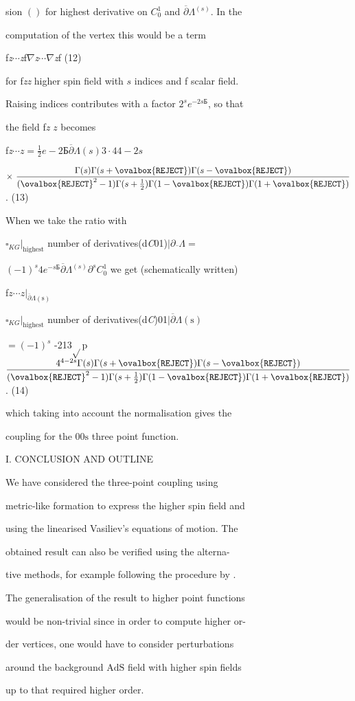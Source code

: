 \documentclass[a4paper,12pt]{article}
\begin{document}
sion $()$ for highest derivative on $C_{0}^{1}$ and $\overline{\partial}\Lambda^{(s)}$. In the

computation of the vertex this would be a term

f{\it z}$\cdots${\it z}f$\nabla${\it z}$\cdots\nabla${\it z}f (12)

for f{\it zz} higher spin field with $s$ indices and f scalar field.

Raising indices contributes with a factor $2^{s}e^{-2sБ}$, so that

the field f{\it z} $z$ becomes

f{\it z}$\cdots z=\displaystyle \frac{1}{2}e-2Б\overline{\partial}\Lambda(s)3\cdot 44-2s$
\begin{center}
$\displaystyle \times\ \frac{\Gamma(s)\Gamma(s+\ovalbox{\tt\small REJECT})\Gamma(s-\ovalbox{\tt\small REJECT})}{(\ovalbox{\tt\small REJECT}^{2}-1)\Gamma(s+\frac{1}{2})\Gamma(1-\ovalbox{\tt\small REJECT})\Gamma(1+\ovalbox{\tt\small REJECT})}$.   (13)
\end{center}
When we take the ratio with

$\square _{KG}|_{\mathrm{h}\mathrm{i}\mathrm{g}\mathrm{h}\mathrm{e}\mathrm{s}\mathrm{t}}$ number of derivatives(d{\it C}01)$|\partial\overline{}\Lambda =$

$(-1)^{s}4e^{-sБ}\overline{\partial}\Lambda^{(s)}\partial^{s}C_{0}^{1}$ we get (schematically written)
\begin{center}
f$ z\cdots z|_{\overline{\partial}\Lambda(\mathrm{s})}$
\end{center}
$\square _{KG}|_{\mathrm{h}\mathrm{i}\mathrm{g}\mathrm{h}\mathrm{e}\mathrm{s}\mathrm{t}}$ number of derivatives(d{\it C})01$| \overline{\partial}\Lambda(\mathrm{s})$

$= (-1)^{s}$ -213$\sqrt{}$p $\displaystyle \frac{4^{4-2s}\Gamma(s)\Gamma(s+\ovalbox{\tt\small REJECT})\Gamma(s-\ovalbox{\tt\small REJECT})}{(\ovalbox{\tt\small REJECT}^{2}-1)\Gamma(s+\frac{1}{2})\Gamma(1-\ovalbox{\tt\small REJECT})\Gamma(1+\ovalbox{\tt\small REJECT})}$. (14)

which taking into account the normalisation gives the

coupling for the $00\mathrm{s}$ three point function.

I. CONCLUSION AND OUTLINE

We have considered the three-point coupling using

metric-like formation to express the higher spin field and

using the linearised Vasiliev’s equations of motion. The

obtained result can also be verified using the alterna-

tive methods, for example following the procedure by .

The generalisation of the result to higher point functions

would be non-trivial since in order to compute higher or-

der vertices, one would have to consider perturbations

around the background $\mathrm{A}\mathrm{d}\mathrm{S}$ field with higher spin fields

up to that required higher order.
\end{document}
